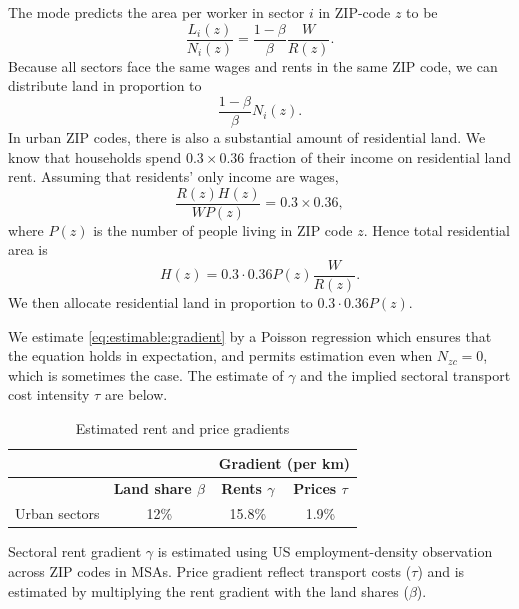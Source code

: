 \documentclass[12pt]{article}
\begin{document}
The mode predicts the area per worker in sector $i$ in ZIP-code $z$ to be
\[
\frac{L_i(z)}{N_i(z)} = \frac{1-\beta}{\beta}\frac{W}{R(z)}.
\]
Because all sectors face the same wages and rents in the same ZIP code, we can distribute land in proportion to
\[
\frac{1-\beta}{\beta}N_i(z).
\]
In urban ZIP codes, there is also a substantial amount of residential land. We know that households spend $0.3\times 0.36$ fraction of their income on residential land rent. Assuming that residents' only income are wages,
\[
\frac{R(z)H(z)}{WP(z)} = 0.3\times 0.36,
\]
where $P(z)$ is the number of people living in ZIP code $z$. Hence total residential area is
\[
H(z) = 0.3\cdot0.36 P(z) \frac{W}{R(z)}.
\]
We then allocate residential land in proportion to $0.3\cdot0.36 P(z)$.

We estimate \eqref{eq:estimable:gradient} by a Poisson regression which ensures that the equation holds in expectation, and permits estimation even when $N_{zc}=0$, which is sometimes the case. The estimate of $\gamma$ and the implied sectoral transport cost intensity $\tau$ are below.

\begin{table}[h!]
  \begin{center}
  \caption{Estimated rent and price gradients}
    \begin{tabular}{rccc}
    \toprule
    \textbf{} & \textbf{} & \multicolumn{2}{c}{\textbf{Gradient (per km)}}\\
    \midrule
    \textbf{} & \textbf{Land share $\beta$ } & \textbf{Rents $\gamma$} & \textbf{Prices $\tau$} \\
    Urban sectors & 12\%  & 15.8\% & 1.9\% \\
    \bottomrule
    \end{tabular}%

  \end{center}
  \label{tab:EmpGrad}%

  \noindent \footnotesize{Sectoral rent gradient $\gamma$ is estimated using US employment-density observation across ZIP codes in MSAs. Price gradient reflect transport costs ($\tau$) and is estimated by multiplying the rent gradient with the land shares ($\beta$). }
\end{table}%
\end{document}
